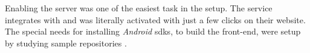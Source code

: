 Enabling the  server was one of the easiest task in the setup.
The  service integrates with  and was literally activated with just a few clicks on their website.
The special needs for installing \textit{Android} \glspl{sdk}, to build the front-end, were setup by studying  sample repositories \citep{testing:nativescript:sample}.

